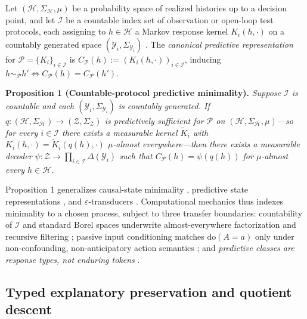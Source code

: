 \documentclass[11pt,letterpaper]{article}
\begin{document}
Let \((\mathcal{H}, \Sigma_{\mathcal{H}}, \mu)\) be a probability space
of realized histories up to a decision point, and let \(\mathcal{I}\) be
a countable index set of observation or open-loop test protocols, each
assigning to \(h \in \mathcal{H}\) a Markov response kernel
\(K_i(h, \cdot)\) on a countably generated space
\((\mathcal{Y}_i, \Sigma_{\mathcal{Y}_i})\)
\citep{blackwell1953, kallenberg2021}. The \emph{canonical predictive
representation} for \(\mathcal{P} = \{K_i\}_{i \in \mathcal{I}}\) is
\(C_{\mathcal{P}}(h) := (K_i(h, \cdot))_{i \in \mathcal{I}}\), inducing
\(h \sim_{\mathcal{P}} h' \iff C_{\mathcal{P}}(h) = C_{\mathcal{P}}(h')\).

\textbf{Proposition 1 (Countable-protocol predictive minimality).}
\emph{Suppose \(\mathcal{I}\) is countable and each
\((\mathcal{Y}_i, \Sigma_{\mathcal{Y}_i})\) is countably generated. If
\(q: (\mathcal{H}, \Sigma_{\mathcal{H}}) \to (\mathcal{Z}, \Sigma_{\mathcal{Z}})\)
is predictively sufficient for \(\mathcal{P}\) on
\((\mathcal{H}, \Sigma_{\mathcal{H}}, \mu)\)---so for every
\(i \in \mathcal{I}\) there exists a measurable kernel
\(\widetilde{K}_i\) with
\(K_i(h, \cdot) = \widetilde{K}_i(q(h), \cdot)\) \(\mu\)-almost
everywhere---then there exists a measurable decoder
\(\psi: \mathcal{Z} \to \prod_{i \in \mathcal{I}} \Delta(\mathcal{Y}_i)\)
such that \(C_{\mathcal{P}}(h) = \psi(q(h))\) for \(\mu\)-almost every
\(h \in \mathcal{H}\).}

Proposition 1 generalizes causal-state minimality
\citep{crutchfieldYoung1989, shaliziCrutchfield2001}, predictive state
representations \citep{littmanSuttonSingh2001}, and
\(\varepsilon\)-transducers \citep{barnettCrutchfield2015}.
Computational mechanics thus indexes minimality to a chosen process,
subject to three transfer boundaries: countability of \(\mathcal{I}\)
and standard Borel spaces underwrite almost-everywhere factorization and
recursive filtering \citep{astrom1965, kaelbling1998}; passive input
conditioning matches \(\mathrm{do}(A=a)\) only under non-confounding,
non-anticipatory action semantics \citep{pearl2009, woodward2003}; and
\emph{predictive classes are response types, not enduring tokens}
\citep{wiggins2001}.

\subsection{Typed explanatory preservation and quotient
descent}\label{typed-explanatory-preservation-and-quotient-descent}
\end{document}
